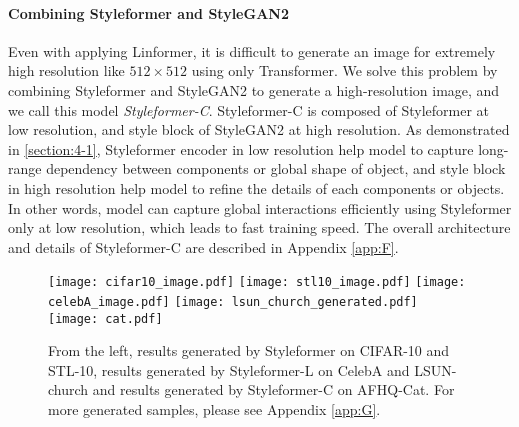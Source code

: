 \documentclass[10pt,twocolumn,letterpaper]{article}
\begin{document}
\paragraph{Combining Styleformer and StyleGAN2}
Even with applying Linformer, it is difficult to generate an image for extremely high resolution like $512\times512$ using only Transformer. We solve this problem by combining Styleformer and StyleGAN2 to generate a high-resolution image, and we call this model \textit{Styleformer-C}. Styleformer-C is composed of Styleformer at low resolution, and style block of StyleGAN2 at high resolution. As demonstrated in \ref{section:4-1}, Styleformer encoder in low resolution help model to capture long-range dependency between components or global shape of object, and style block in high resolution help model to refine the details of each components or objects. In other words, model can capture global interactions efficiently using Styleformer only at low resolution, which leads to fast training speed. The overall architecture and details of Styleformer-C are described in Appendix \ref{app:F}.


\begin{figure*}[t]
\begin{center}
\texttt{[image: cifar10\_image.pdf]}
\texttt{[image: stl10\_image.pdf]}
\texttt{[image: celebA\_image.pdf]}
\texttt{[image: lsun\_church\_generated.pdf]}
\texttt{[image: cat.pdf]}
\end{center}
\vspace{-5mm}
\caption{From the left, results generated by Styleformer on CIFAR-10 and STL-10, results generated by Styleformer-L on CelebA and LSUN-church and results generated by Styleformer-C on AFHQ-Cat. For more generated samples, please see Appendix \ref{app:G}.
}
\vspace{-3mm}
\label{fig:cifar}
\end{figure*}
\end{document}
